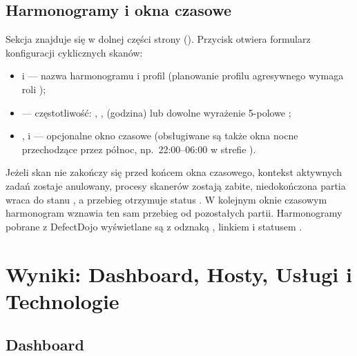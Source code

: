 \documentclass[10pt,a4paper]{article}
\begin{document}

\subsection{Harmonogramy i okna czasowe}

Sekcja  znajduje się w dolnej części strony  (). Przycisk  otwiera formularz konfiguracji cyklicznych skanów:
\begin{itemize}
  \item {} i  --- nazwa harmonogramu i profil (planowanie profilu agresywnego wymaga roli );
  \item {} --- częstotliwość: , ,  (godzina) lub dowolne wyrażenie 5-polowe ;
  \item {},  i  --- opcjonalne okno czasowe (obsługiwane są także okna nocne przechodzące przez północ, np.~22:00--06:00 w strefie ).
\end{itemize}

Jeżeli skan nie zakończy się przed końcem okna czasowego, kontekst aktywnych zadań zostaje anulowany, procesy skanerów zostają zabite, niedokończona partia wraca do stanu , a przebieg otrzymuje status . W kolejnym oknie czasowym harmonogram wznawia ten sam przebieg od pozostałych partii. Harmonogramy pobrane z DefectDojo wyświetlane są z odznaką , linkiem  i statusem .


\section{Wyniki: Dashboard, Hosty, Usługi i Technologie}

\subsection{Dashboard}
\end{document}
